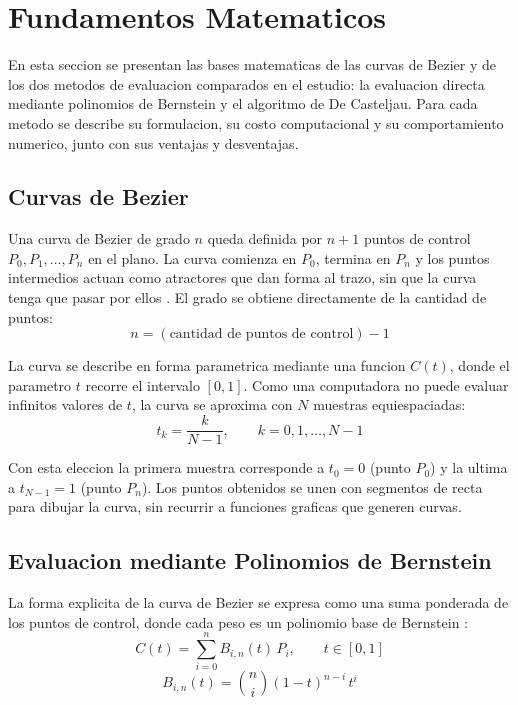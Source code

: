 \section{Fundamentos Matematicos}
\label{sec:fundamentos}

En esta seccion se presentan las bases matematicas de las curvas de Bezier y de los dos metodos de evaluacion comparados en el estudio: la evaluacion directa mediante polinomios de Bernstein y el algoritmo de De Casteljau. Para cada metodo se describe su formulacion, su costo computacional y su comportamiento numerico, junto con sus ventajas y desventajas.

\subsection{Curvas de Bezier}
\label{subsec:fund_bezier}

Una curva de Bezier de grado $n$ queda definida por $n+1$ puntos de control $P_0, P_1, \dots, P_n$ en el plano. La curva comienza en $P_0$, termina en $P_n$ y los puntos intermedios actuan como atractores que dan forma al trazo, sin que la curva tenga que pasar por ellos \cite{farin2002}. El grado se obtiene directamente de la cantidad de puntos:
\begin{equation}
\label{eq:fund_grado}
n = (\text{cantidad de puntos de control}) - 1
\end{equation}

La curva se describe en forma parametrica mediante una funcion $C(t)$, donde el parametro $t$ recorre el intervalo $[0, 1]$. Como una computadora no puede evaluar infinitos valores de $t$, la curva se aproxima con $N$ muestras equiespaciadas:
\begin{equation}
\label{eq:fund_muestreo}
t_k = \frac{k}{N - 1}, \qquad k = 0, 1, \dots, N - 1
\end{equation}

Con esta eleccion la primera muestra corresponde a $t_0 = 0$ (punto $P_0$) y la ultima a $t_{N-1} = 1$ (punto $P_n$). Los puntos obtenidos se unen con segmentos de recta para dibujar la curva, sin recurrir a funciones graficas que generen curvas.

\subsection{Evaluacion mediante Polinomios de Bernstein}
\label{subsec:fund_bernstein}

La forma explicita de la curva de Bezier se expresa como una suma ponderada de los puntos de control, donde cada peso es un polinomio base de Bernstein \cite{farin2002,piegl1997}:
\begin{equation}
\label{eq:bernstein}
C(t) = \sum_{i=0}^{n} B_{i,n}(t)\, P_i, \qquad t \in [0, 1]
\end{equation}
\begin{equation}
\label{eq:fund_base}
B_{i,n}(t) = \binom{n}{i} (1 - t)^{n-i}\, t^{i}
\end{equation}

